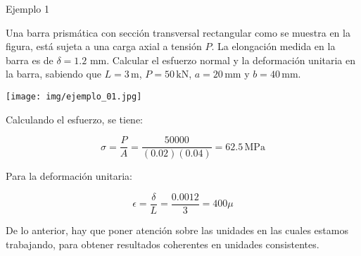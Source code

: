 \documentclass[12pt,letterpaper]{article}
\begin{document}
\begin{ejemplo}{Ejemplo 1}

Una barra prismática con sección transversal rectangular como se muestra en la figura, está sujeta a 
una carga axial a tensión $P$. La elongación medida en la barra es de $\delta = 1.2 \,\, \text{mm}$. 
Calcular el esfuerzo normal y la deformación unitaria en la barra, sabiendo que $L = 3\,\text{m} $, 
$P = 50 \, \text{kN}$, $a=20 \, \text{mm}$ y $b=40 \, \text{mm}$.

\begin{center}
\texttt{[image: img/ejemplo\_01.jpg]}
\end{center}

Calculando el esfuerzo, se tiene:

$$ \sigma = \frac{P}{A} = \frac{50 000}{(0.02)(0.04)} = 62.5 \, \text{MPa} $$

Para la deformación unitaria:

$$ \epsilon = \frac{\delta}{L} = \frac{0.0012}{3} = 400 \mu $$

De lo anterior, hay que poner atención sobre las unidades en las cuales estamos trabajando, 
para obtener resultados coherentes en unidades consistentes.

\end{ejemplo}
\end{document}
